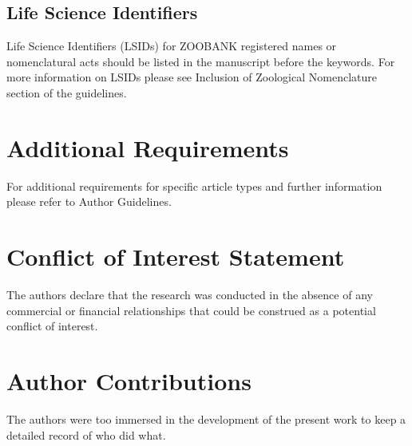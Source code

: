 \documentclass[utf8]{FrontiersinHarvard} %
\providecommand{\href}[2]{#2}
\renewcommand*{\|}[1][]{\nonscript\:#1\vert\nonscript\:\mathopen{}}
\begin{document}
\subsection{Life Science Identifiers}
Life Science Identifiers (LSIDs) for ZOOBANK registered names or nomenclatural acts should be listed in the manuscript before the keywords. For more information on LSIDs please see \href{https://www.frontiersin.org/about/author-guidelines#Nomenclature}{Inclusion of Zoological Nomenclature} section of the guidelines.


\section{Additional Requirements}

For additional requirements for specific article types and further information please refer to \href{http://www.frontiersin.org/about/AuthorGuidelines#AdditionalRequirements}{Author Guidelines}.

\section*{Conflict of Interest Statement}

The authors declare that the research was conducted in the absence of any commercial or financial relationships that could be construed as a potential conflict of interest.

\section*{Author Contributions}

The authors were too immersed in the development of the present work to keep a detailed record of who did what.

\end{document}
